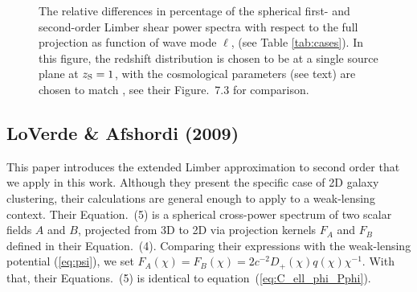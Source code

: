 \documentclass[fleqn,usenatbib]{mnras} %
\begin{document}
\begin{appendix}
\begin{figure}

  \begin{center}
  \end{center}

    \caption{The relative differences in percentage of the spherical first- and second-order Limber
    shear power spectra with respect to the full projection
    as function of wave mode $\ell$, (see Table \ref{tab:cases}). In this figure, the redshift distribution is chosen to be
    at a single source plane at $z_{\rm S}=1$, with the cosmological parameters (see text) are chosen to match
    \citet{vande2012}, see their Figure.~7.3 for comparison.
    }

    \label{fig:L1L2E_Rijt}

\end{figure}



\subsection{LoVerde \& Afshordi (2009)}

This paper introduces the extended Limber approximation to second order that we
apply in this work. Although they present the specific case of 2D galaxy
clustering, their calculations are general enough to apply to a weak-lensing
context. Their Equation.~(5) is a spherical cross-power spectrum of two scalar fields
$A$ and $B$, projected from 3D to 2D via projection kernels $F_A$ and $F_B$
defined in their Equation.~(4). Comparing their expressions with the weak-lensing
potential (\ref{eq:psi}), we set $F_A(\chi) = F_B(\chi) = 2 c^{-2}
D_+(\chi) q(\chi) \chi^{-1}$. With that, their Equations.~(5) is identical to equation~(\ref{eq:C_ell_phi_Pphi}).


\end{appendix}
\end{document}
